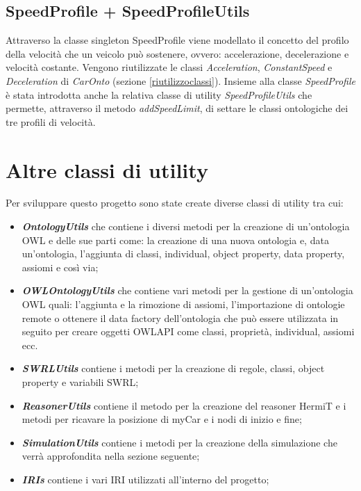 \subsection{SpeedProfile + SpeedProfileUtils}
Attraverso la classe singleton SpeedProfile viene modellato il concetto del profilo della velocit\`a che un veicolo pu\`o sostenere, ovvero: accelerazione, decelerazione e velocit\`a costante.
Vengono riutilizzate le classi \textit{Acceleration}, \textit{ConstantSpeed} e \textit{Deceleration} di \textit{CarOnto} (sezione \ref{riutilizzoclassi}).
Insieme alla classe \textit{SpeedProfile} \`e stata introdotta anche la relativa classe di utility \textit{SpeedProfileUtils} che permette, attraverso il metodo \textit{addSpeedLimit}, di settare le classi ontologiche dei tre profili di velocit\`a.
\section{Altre classi di utility}
Per sviluppare questo progetto sono state create diverse classi di utility tra cui:
\begin{itemize}
\item \textit{\textbf{OntologyUtils}} che contiene i diversi metodi per la creazione di un'ontologia OWL e delle sue parti come: la creazione di una nuova ontologia e, data un'ontologia, l'aggiunta di classi, individual, object property, data property, assiomi e cos\`i via;
\item \textit{\textbf{OWLOntologyUtils}} che contiene vari metodi per la gestione di un'ontologia OWL quali: l'aggiunta e la rimozione di assiomi, l'importazione di ontologie remote o ottenere il data factory dell'ontologia che pu\`o essere utilizzata in seguito per creare oggetti OWLAPI come classi, propriet\`a, individual, assiomi ecc.
\item \textit{\textbf{SWRLUtils}} contiene i metodi per la creazione di regole, classi, object property e variabili SWRL;
\item \textit{\textbf{ReasonerUtils}} contiene il metodo per la creazione del reasoner HermiT e i metodi per ricavare la posizione di myCar e i nodi di inizio e fine;
\item \textit{\textbf{SimulationUtils}} contiene i metodi per la creazione della simulazione che verr\`a approfondita nella sezione seguente;
\item \textit{\textbf{IRIs}} contiene i vari IRI utilizzati all'interno del progetto;
\end{itemize}

